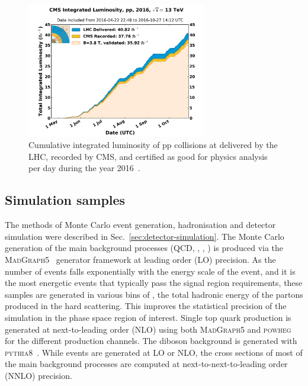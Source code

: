 \begin{figure}[!htb]
\label{fig:lumi}
\includegraphics[width=0.7\textwidth]{figs/analysis/cmslumi}
\caption{Cumulative integrated luminosity of pp collisions at \com delivered by 
the LHC, recorded by CMS, and certified as good for physics analysis per day 
during the year 2016~\cite{cmslumi16}.}
\end{figure}


\subsection{Simulation samples}
\label{sec:analysis-samples-mc}

The methods of Monte Carlo event generation, hadronisation and detector 
simulation were described in Sec.~\ref{sec:detector-simulation}.
The Monte Carlo generation of the main background processes (QCD, \zj, \wj, 
\ttbar) is produced via the \textsc{MadGraph5}~\cite{madgraph,madgraph-amcnlo} 
generator framework at leading order (LO) precision. 
As the number of events falls exponentially with the energy scale of the event, 
and it is the most energetic events that typically pass the signal region 
requirements, these samples are generated in various bins of \hthat, the total 
hadronic energy of the partons produced in the hard scattering. 
This improves the statistical precision of the simulation in the phase space 
region of interest.
Single top quark production is generated at next-to-leading order (NLO) using 
both \textsc{MadGraph5} and \textsc{powheg}~\cite{powheg} for the different 
production channels. The diboson background is generated with 
\textsc{pythia8}~\cite{pythia}.
While events are generated at LO or NLO, the cross sections of most of the main 
background processes are computed at next-to-next-to-leading order (NNLO) 
precision.%

